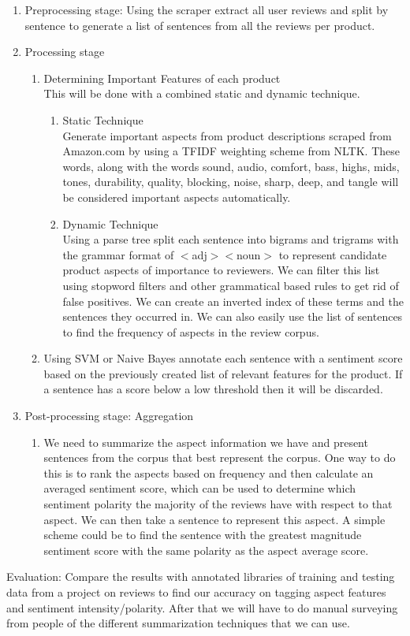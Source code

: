 \documentclass{article}
\begin{document}
\begin{enumerate}
\item Preprocessing stage: 
\newline Using the scraper extract all user reviews and split by sentence to generate a list of sentences from all the reviews per product.

\item Processing stage
	\begin{enumerate} [label* = \arabic*.]
	\item Determining Important Features of each product \\
	This will be done with a combined static and dynamic technique.
		\begin{enumerate} [label* = \arabic*.]
	\item Static Technique \\
	 Generate important aspects from product descriptions scraped from Amazon.com by using a TFIDF weighting scheme from NLTK. These words, along with the words sound, audio, comfort, bass, highs, mids, tones, durability, quality, blocking, noise, sharp, deep, and tangle will be considered important aspects automatically.
	\item Dynamic Technique \\
	 Using a parse tree split each sentence into bigrams and trigrams with the grammar format of $<$adj$><$noun$>$ to represent candidate product aspects of importance to reviewers. We can filter this list using stopword filters and other grammatical based rules to get rid of false positives. We can create an inverted index of these terms and the sentences they occurred in. We can also easily use the list of sentences to find the frequency of aspects in the review corpus.
	\end{enumerate}
		\item Using SVM or Naive Bayes annotate each sentence with a sentiment score based on the previously created list of relevant features for the product. If a sentence has a score below a low threshold then it will be discarded.
	\end{enumerate}
\item Post-processing stage: Aggregation
	\begin{enumerate}[label* = \arabic*.]
	\item We need to summarize the aspect information we have and present sentences from the corpus that best represent the corpus. One way to do this is to rank the aspects based on frequency and then calculate an averaged sentiment score, which can be used to determine which sentiment polarity the majority of the reviews have with respect to that aspect. We can then take a sentence to represent this aspect. A simple scheme could be to find the sentence with the greatest magnitude sentiment score with the same polarity as the aspect average score.
	\end{enumerate}
\end{enumerate}
Evaluation: Compare the results with annotated libraries of training and testing data from a project on reviews to find our accuracy on tagging aspect features and sentiment intensity/polarity.
After that we will have to do manual surveying from people of the different summarization techniques that we can use.
\end{document}

